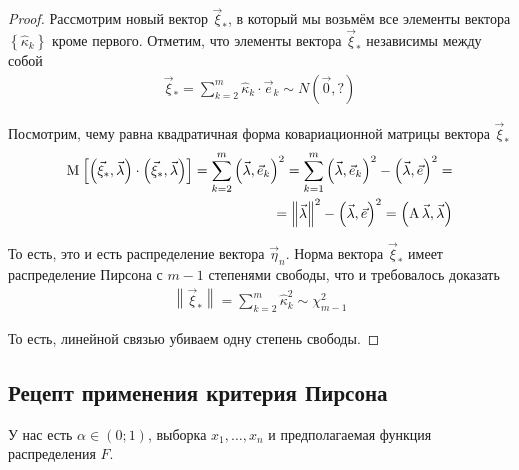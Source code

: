 \begin{proof}
    Рассмотрим новый вектор $\vec{\xi}_*$, в который мы возьмём все элементы
    вектора $\left\{ \hat{\kappa}_k \right\}$ кроме первого. Отметим, что
    элементы вектора $\vec{\xi}_*$ независимы между собой
    \begin{align*}
        \vec{\xi}_* = \sum_{k=2}^{m} \hat{\kappa}_k \cdot \vec{e}_k
        \sim N\left( \vec{0}, ? \right)
    \end{align*}

    Посмотрим, чему равна квадратичная форма ковариационной матрицы вектора
    $\vec{\xi}_*$
    \begin{align*}
        \operatorname{M}_{} \left[ \left( \vec{\xi}_*, \vec{\lambda} \right) \cdot
            \left( \vec{\xi}_*, \vec{\lambda} \right) \right]
        = \sum_{k=2}^{m}\left( \vec{\lambda}, \vec{e}_k \right)^2
        = \sum_{k=1}^{m}\left( \vec{\lambda}, \vec{e}_k \right)^2
            - \left( \vec{\lambda}, \vec{e} \right)^2 = \\
        = \left\| \vec{\lambda} \right\|^2
            - \left( \vec{\lambda}, \vec{e} \right)^2
        = \left( \operatorname{A} \vec{\lambda}, \vec{\lambda} \right)
    \end{align*}

    То есть, это и есть распределение вектора $\vec{\eta}_n$. Норма вектора
    $\vec{\xi}_*$ имеет распределение Пирсона с $m-1$ степенями свободы, что и
    требовалось доказать
    \begin{align*}
        \left\| \vec{\xi}_* \right\| = \sum_{k=2}^{m} \hat{\kappa}_k^2
        \sim \chi_{m-1}^2
    \end{align*}

    То есть, линейной связью убиваем одну степень свободы.
\end{proof}

\subsection{Рецепт применения критерия Пирсона}
У нас есть $\alpha \in \left( 0; 1 \right)$, выборка $x_1, \dots, x_n$ и
предполагаемая функция распределения $F$.


